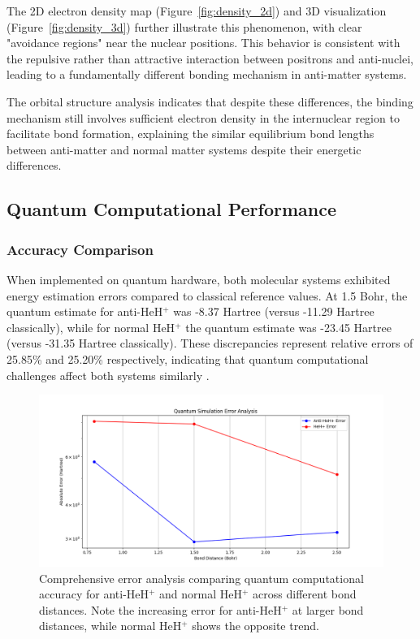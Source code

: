 \documentclass[10pt,twocolumn,a4paper]{article}
\begin{document}
The 2D electron density map (Figure~\ref{fig:density_2d}) and 3D visualization (Figure~\ref{fig:density_3d}) further illustrate this phenomenon, with clear "avoidance regions" near the nuclear positions. This behavior is consistent with the repulsive rather than attractive interaction between positrons and anti-nuclei, leading to a fundamentally different bonding mechanism in anti-matter systems.

The orbital structure analysis indicates that despite these differences, the binding mechanism still involves sufficient electron density in the internuclear region to facilitate bond formation, explaining the similar equilibrium bond lengths between anti-matter and normal matter systems despite their energetic differences.

\subsection{Quantum Computational Performance}

\subsubsection{Accuracy Comparison}
When implemented on quantum hardware, both molecular systems exhibited energy estimation errors compared to classical reference values. At 1.5 Bohr, the quantum estimate for anti-HeH$^+$ was -8.37 Hartree (versus -11.29 Hartree classically), while for normal HeH$^+$ the quantum estimate was -23.45 Hartree (versus -31.35 Hartree classically). These discrepancies represent relative errors of 25.85\% and 25.20\% respectively, indicating that quantum computational challenges affect both systems similarly \cite{sharma2020noise}.

\begin{figure}[t!]
    \centering
    \includegraphics[width=\columnwidth]{graphs/quantum_error_analysis.png}
    \caption{Comprehensive error analysis comparing quantum computational accuracy for anti-HeH$^+$ and normal HeH$^+$ across different bond distances. Note the increasing error for anti-HeH$^+$ at larger bond distances, while normal HeH$^+$ shows the opposite trend.}
    \label{fig:error_analysis}
\end{figure}
\end{document}
